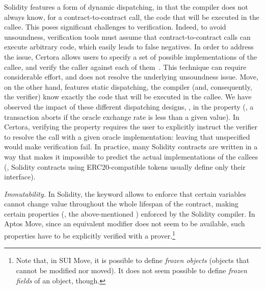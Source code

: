 %
Solidity features a form of dynamic dispatching, in that the compiler does not always know, for a contract-to-contract call, the code that will be executed in the callee. 
This poses significant challenges to verification. 
Indeed, to avoid unsoundness, verification tools must assume that contract-to-contract calls can execute arbitrary code, which easily leads to false negatives.
In order to address the issue, Certora 
allows users to specify a set of possible implementations of the callee, and verify the caller against each of them~\cite{certora-dispatcher}.
This technique can require considerable effort, and does not resolve the underlying unsoundness issue.
Move, on the other hand, features static dispatching, \ie the compiler (and, consequently, the verifier) know exactly the code that will be executed in the callee.
We have observed the impact of these different dispatching designs, \eg, in the property  (\ie, a  transaction aborts if the  oracle exchange rate is less than a given value).
In Certora, verifying the property requires the user to explicitly instruct the verifier to resolve the call with a given oracle implementation: leaving that unspecified would make verification fail.
In practice, many Solidity contracts are written in a way that makes it impossible to predict the actual implementations of the callees (\eg, Solidity contracts using ERC20-compatible tokens usually define only their interface).


%
\emph{Immutability.} In Solidity, the  keyword allows to enforce that certain variables cannot change value throughout the whole lifespan of the contract, making certain properties (\eg, the above-mentioned ) enforced by the Solidity compiler. In Aptos Move, since an equivalent modifier does not seem to be available, such properties have to be explicitly verified with a prover.\footnote{Note that, in SUI Move, %
it is possible to define \emph{frozen objects} (\ie objects that cannot be modified nor moved). It does not seem possible to define \emph{frozen fields} of an object, though.}

